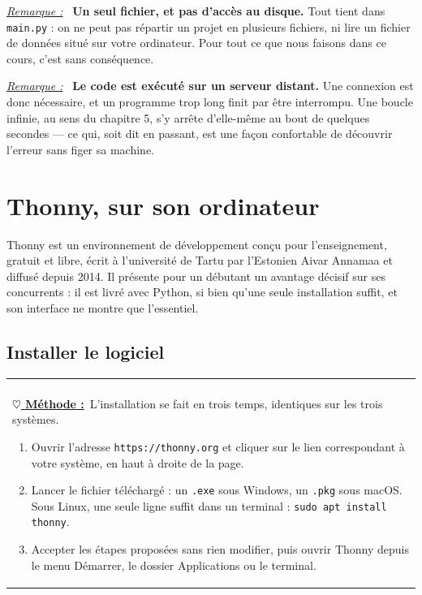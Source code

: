 \documentclass[a4paper,11pt,openany]{book}
\makeatletter
\newcommand{\code}[1]{\texttt{\textcolor{codebleu}{#1}}}
\newenvironment{cadre}%
 {\par\vspace{2mm}\noindent\begin{tabular}{|@{\hspace{4mm}}p{0.93\textwidth}@{\hspace{4mm}}|}
  \hline \\[-2mm]}%
 {\\[2mm] \hline \end{tabular}\par\vspace{3mm}}
\newcommand{\methode}{\textbf{\underline{$\heartsuit$ Méthode :}}~}
\newenvironment{remarque}%
 {\par\vspace{1mm}\begin{list}{}{\leftmargin=1cm \rightmargin=0.5cm}\item[]%
  \textit{\underline{Remarque :}}~}%
 {\end{list}\vspace{1mm}}
\makeatother
\begin{document}
\begin{remarque}
\textbf{Un seul fichier, et pas d'accès au disque.} Tout tient dans \code{main.py} : on ne peut pas répartir un projet en plusieurs fichiers, ni lire un fichier de données situé sur votre ordinateur. Pour tout ce que nous faisons dans ce cours, c'est sans conséquence.
\end{remarque}

\begin{remarque}
\textbf{Le code est exécuté sur un serveur distant.} Une connexion est donc nécessaire, et un programme trop long finit par être interrompu. Une boucle infinie, au sens du chapitre 5, s'y arrête d'elle-même au bout de quelques secondes — ce qui, soit dit en passant, est une façon confortable de découvrir l'erreur sans figer sa machine.
\end{remarque}

\section{Thonny, sur son ordinateur}

Thonny est un environnement de développement conçu pour l'enseignement, gratuit et libre, écrit à l'université de Tartu par l'Estonien Aivar Annamaa et diffusé depuis 2014. Il présente pour un débutant un avantage décisif sur ses concurrents : il est livré avec Python, si bien qu'une seule installation suffit, et son interface ne montre que l'essentiel.

\subsection{Installer le logiciel}

\begin{cadre}
\methode L'installation se fait en trois temps, identiques sur les trois systèmes.
\begin{enumerate}[leftmargin=8mm,itemsep=0.5mm,topsep=1mm]
\item Ouvrir l'adresse \code{https://thonny.org} et cliquer sur le lien correspondant à votre système, en haut à droite de la page.
\item Lancer le fichier téléchargé : un \code{.exe} sous Windows, un \code{.pkg} sous macOS. Sous Linux, une seule ligne suffit dans un terminal : \code{sudo apt install thonny}.
\item Accepter les étapes proposées sans rien modifier, puis ouvrir Thonny depuis le menu Démarrer, le dossier Applications ou le terminal.
\end{enumerate}
\end{cadre}
\end{document}

